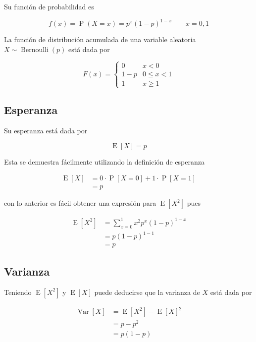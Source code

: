 \documentclass[]{book}
\theoremstyle{plain}
\theoremstyle{definition}
\theoremstyle{definition} %
\begin{document}
Su función de probabilidad es

\[\displaystyle f(x)=\operatorname {P} (X=x)=p^{x}(1-p)^{1-x}\qquad x=0,1\]

La función de distribución acumulada de una variable aleatoria
\(\displaystyle X\sim \operatorname {Bernoulli} (p)\) está dada por

\[\displaystyle F(x)={\begin{cases}0&x<0\\1-p&0\leq x<1\\1&x\geq 1\end{cases}}\]

\hypertarget{esperanza}{%
\subsection{Esperanza}\label{esperanza}}

Su esperanza está dada por

\[\displaystyle \operatorname {E} \left[X\right]=p\]

Esta se demuestra fácilmente utilizando la definición de esperanza

\[\displaystyle {\begin{aligned}\operatorname {E} [X]&=0\cdot \operatorname {P} [X=0]+1\cdot \operatorname {P} [X=1]\\&=p\end{aligned}}\]

con lo anterior es fácil obtener una expresión para
\(\displaystyle \operatorname {E} [X^{2}]\) pues

\[\displaystyle {\begin{aligned}\operatorname {E} [X^{2}]&=\sum _{x=0}^{1}x^{2}p^{x}(1-p)^{1-x}\\&=p(1-p)^{1-1}\\&=p\end{aligned}}\]

\hypertarget{varianza}{%
\subsection{Varianza}\label{varianza}}

Teniendo \(\displaystyle \operatorname {E} [X^{2}]\) y
\(\displaystyle \operatorname {E} [X]\) puede deducirse que la varianza
de \(X\) está dada por

\[\displaystyle {\begin{aligned}\operatorname {Var} \left[X\right]&=\operatorname {E} [X^{2}]-\operatorname {E} [X]^{2}\\&=p-p^{2}\\&=p\left(1-p\right)\end{aligned}}\]
\end{document}

